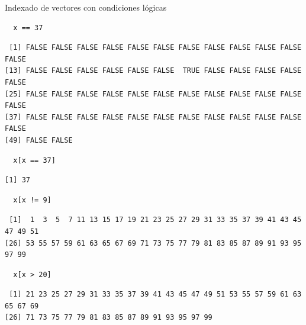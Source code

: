 \documentclass[xcolor={usenames,svgnames,dvipsnames}]{beamer}
\begin{document}
\begin{frame}[fragile,label=sec-2-1-8]{Indexado de vectores con condiciones lógicas}
 \lstset{language=R,label= ,caption= ,numbers=none}
\begin{lstlisting}
  x == 37
\end{lstlisting}

\begin{verbatim}
 [1] FALSE FALSE FALSE FALSE FALSE FALSE FALSE FALSE FALSE FALSE FALSE FALSE
[13] FALSE FALSE FALSE FALSE FALSE FALSE  TRUE FALSE FALSE FALSE FALSE FALSE
[25] FALSE FALSE FALSE FALSE FALSE FALSE FALSE FALSE FALSE FALSE FALSE FALSE
[37] FALSE FALSE FALSE FALSE FALSE FALSE FALSE FALSE FALSE FALSE FALSE FALSE
[49] FALSE FALSE
\end{verbatim}

\lstset{language=R,label= ,caption= ,numbers=none}
\begin{lstlisting}
  x[x == 37]
\end{lstlisting}

\begin{verbatim}
[1] 37
\end{verbatim}

\lstset{language=R,label= ,caption= ,numbers=none}
\begin{lstlisting}
  x[x != 9]
\end{lstlisting}

\begin{verbatim}
 [1]  1  3  5  7 11 13 15 17 19 21 23 25 27 29 31 33 35 37 39 41 43 45 47 49 51
[26] 53 55 57 59 61 63 65 67 69 71 73 75 77 79 81 83 85 87 89 91 93 95 97 99
\end{verbatim}

\lstset{language=R,label= ,caption= ,numbers=none}
\begin{lstlisting}
  x[x > 20]
\end{lstlisting}

\begin{verbatim}
 [1] 21 23 25 27 29 31 33 35 37 39 41 43 45 47 49 51 53 55 57 59 61 63 65 67 69
[26] 71 73 75 77 79 81 83 85 87 89 91 93 95 97 99
\end{verbatim}
\end{frame}
\end{document}
